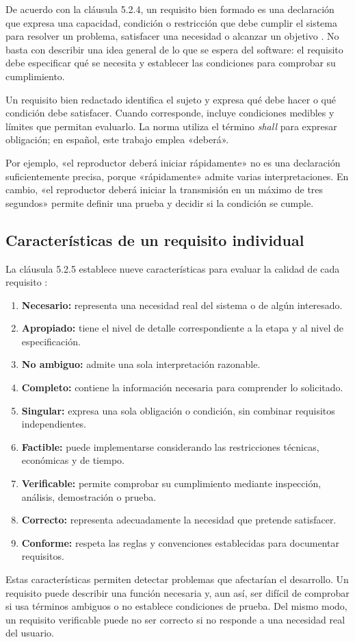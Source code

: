 \documentclass[10pt,a4paper]{article}
\begin{document}
De acuerdo con la cláusula 5.2.4, un requisito bien formado es una declaración que expresa una capacidad, condición o restricción que debe cumplir el sistema para resolver un problema, satisfacer una necesidad o alcanzar un objetivo \cite[cl.~5.2.4]{iso29148}. No basta con describir una idea general de lo que se espera del software: el requisito debe especificar qué se necesita y establecer las condiciones para comprobar su cumplimiento.

Un requisito bien redactado identifica el sujeto y expresa qué debe hacer o qué condición debe satisfacer. Cuando corresponde, incluye condiciones medibles y límites que permitan evaluarlo. La norma utiliza el término \textit{shall} para expresar obligación; en español, este trabajo emplea «deberá».

Por ejemplo, «el reproductor deberá iniciar rápidamente» no es una declaración suficientemente precisa, porque «rápidamente» admite varias interpretaciones. En cambio, «el reproductor deberá iniciar la transmisión en un máximo de tres segundos» permite definir una prueba y decidir si la condición se cumple.

\subsection{Características de un requisito individual}
La cláusula 5.2.5 establece nueve características para evaluar la calidad de cada requisito \cite[cl.~5.2.5]{iso29148}:
\begin{enumerate}[label=\arabic*.]
  \item \textbf{Necesario:} representa una necesidad real del sistema o de algún interesado.
  \item \textbf{Apropiado:} tiene el nivel de detalle correspondiente a la etapa y al nivel de especificación.
  \item \textbf{No ambiguo:} admite una sola interpretación razonable.
  \item \textbf{Completo:} contiene la información necesaria para comprender lo solicitado.
  \item \textbf{Singular:} expresa una sola obligación o condición, sin combinar requisitos independientes.
  \item \textbf{Factible:} puede implementarse considerando las restricciones técnicas, económicas y de tiempo.
  \item \textbf{Verificable:} permite comprobar su cumplimiento mediante inspección, análisis, demostración o prueba.
  \item \textbf{Correcto:} representa adecuadamente la necesidad que pretende satisfacer.
  \item \textbf{Conforme:} respeta las reglas y convenciones establecidas para documentar requisitos.
\end{enumerate}
Estas características permiten detectar problemas que afectarían el desarrollo. Un requisito puede describir una función necesaria y, aun así, ser difícil de comprobar si usa términos ambiguos o no establece condiciones de prueba. Del mismo modo, un requisito verificable puede no ser correcto si no responde a una necesidad real del usuario.
\end{document}
